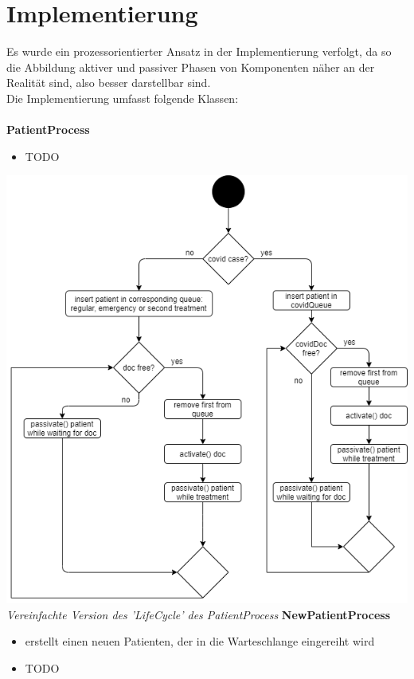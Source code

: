 \documentclass{article}
\begin{document}
\section{Implementierung}
Es wurde ein prozessorientierter Ansatz in der Implementierung verfolgt, da so die Abbildung aktiver und passiver Phasen von Komponenten näher an der Realität sind, also besser darstellbar sind.\\
Die Implementierung umfasst folgende Klassen:\\\\
\textbf{PatientProcess}
\begin{itemize}
    \item TODO
\end{itemize}
\includegraphics[width=\textwidth]{img/patientProcess.png}
\textit{Vereinfachte Version des 'LifeCycle' des PatientProcess}
\textbf{NewPatientProcess}
\begin{itemize}
    \item erstellt einen neuen Patienten, der in die Warteschlange eingereiht wird
    \item TODO
\end{itemize}
\end{document}
